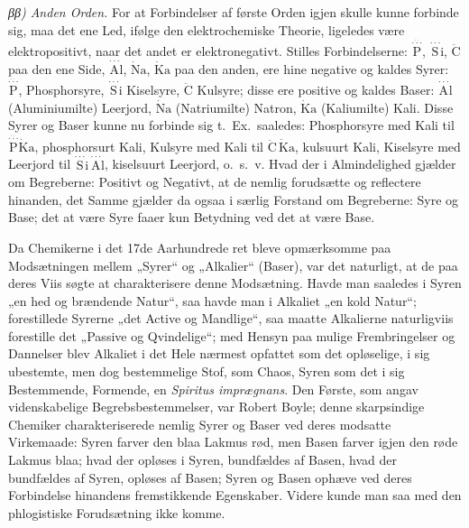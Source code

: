 \documentclass[12pt,a4paper]{book}
\begin{document}
\emph{ββ) Anden Orden.} For at Forbindelser af første
Orden igjen skulle kunne forbinde sig, maa det ene Led, ifølge
den elektrochemiske Theorie, ligeledes være elektropositivt, naar
det andet er elektronegativt. Stilles Forbindelserne:
$\stackrel{\stackrel{\cdot\cdot}{\cdot\cdot\cdot}}{\mathrm{P}}$,
$\stackrel{\cdot\cdot\cdot}{\mathrm{S}}\mathrm{i}$,
$\ddot{\mathrm{C}}$
paa den ene Side,
$\stackrel{\cdot\cdot\cdot}{\mathrm{A}}\mathrm{l}$,
$\dot{\mathrm{N}}\mathrm{a}$, $\dot{\mathrm{K}}\mathrm{a}$
paa den anden, ere hine
negative og kaldes Syrer:
$\stackrel{\stackrel{\cdot\cdot}{\cdot\cdot\cdot}}{\mathrm{P}}$,
Phosphorsyre, $\stackrel{\cdot\cdot\cdot}{\mathrm{S}}\mathrm{i}$
Kiselsyre, $\ddot{\mathrm{C}}$ Kulsyre; disse ere positive og kaldes
Baser: $\stackrel{\cdot\cdot\cdot}{\mathrm{A}}\mathrm{l}$
(Aluminiumilte) Leerjord, $\dot{\mathrm{N}}\mathrm{a}$ (Natriumilte)
Natron, $\dot{\mathrm{K}}\mathrm{a}$ (Kaliumilte) Kali.
Disse Syrer og Baser kunne nu forbinde sig t.\ Ex.\ saaledes:
Phosphorsyre med Kali til
$\stackrel{\stackrel{\cdot\cdot}{\cdot\cdot\cdot}}{\mathrm{P}}\dot{\mathrm{K}}\mathrm{a}$,
phosphorsurt Kali, Kulsyre med Kali til
$\ddot{\mathrm{C}}\,\dot{\mathrm{K}}\mathrm{a}$, kulsuurt Kali,
Kiselsyre med Leerjord til
$\stackrel{\cdot\cdot\cdot}{\mathrm{S}}\mathrm{i}\,\stackrel{\cdot\cdot\cdot}{\mathrm{A}}\mathrm{l}$,
kiselsuurt Leerjord, o.\ s.\ v. Hvad der i Almindelighed
gjælder om Begreberne: Positivt og Negativt, at de
nemlig forudsætte og reflectere hinanden, det Samme gjælder
da ogsaa i særlig Forstand om Begreberne: Syre og Base;
det at være Syre faaer kun Betydning ved det at være Base.

Da Chemikerne i det 17de Aarhundrede ret bleve opmærksomme
paa Modsætningen mellem „Syrer“ og „Alkalier“
(Baser), var det naturligt, at de paa deres Viis søgte at
charakterisere denne Modsætning. Havde man saaledes i Syren
„en hed og brændende Natur“, saa havde man i Alkaliet „en
kold Natur“; forestillede Syrerne „det Active og Mandlige“,
saa maatte Alkalierne naturligviis forestille det „Passive og
Qvindelige“; med Hensyn paa mulige Frembringelser og
Dannelser blev Alkaliet i det Hele nærmest opfattet som det
opløselige, i sig ubestemte, men dog bestemmelige Stof, som
Chaos, Syren som det i sig Bestemmende, Formende, en
\textit{Spiritus imprægnans}. Den Første, som angav videnskabelige
Begrebsbestemmelser, var Robert Boyle; denne skarpsindige
Chemiker charakteriserede nemlig Syrer og Baser ved
deres modsatte Virkemaade: Syren farver den blaa Lakmus
rød, men Basen farver igjen den røde Lakmus blaa; hvad
der opløses i Syren, bundfældes af Basen, hvad der bundfældes
af Syren, opløses af Basen; Syren og Basen ophæve
ved deres Forbindelse hinandens fremstikkende Egenskaber.
Videre kunde man saa med den phlogistiske Forudsætning
ikke komme.
\setcounter{footnote}{0}
\end{document}
